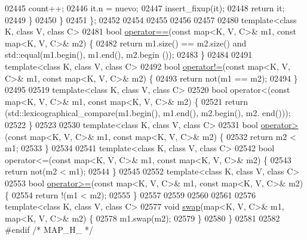 \begin{DoxyCode}
02445             count++;
02446             it.n = nuevo;
02447             insert\_fixup(it);
02448             \textcolor{keywordflow}{return} it;
02449         \}
02450     \}
02451 \};
02452 
02454 
02455 
02456 
02457 
02480 \textcolor{keyword}{template}<\textcolor{keyword}{class} K, \textcolor{keyword}{class} V, \textcolor{keyword}{class} C>
02481 \textcolor{keywordtype}{bool} \hyperlink{classaed2_1_1map_abfc51b39670220e79037ac067006e933_abfc51b39670220e79037ac067006e933}{operator==}(\textcolor{keyword}{const} map<K, V, C>& m1, \textcolor{keyword}{const} map<K, V, C>& m2) \{
02482     \textcolor{keywordflow}{return} m1.size() == m2.size() and std::equal(m1.begin(), m1.end(), m2.begin
      ());
02483 \}
02484 
02491 \textcolor{keyword}{template}<\textcolor{keyword}{class} K, \textcolor{keyword}{class} V, \textcolor{keyword}{class} C>
02492 \textcolor{keywordtype}{bool} \hyperlink{classaed2_1_1map_abce0fa35c5b25fd67111c2e704616f09_abce0fa35c5b25fd67111c2e704616f09}{operator!=}(\textcolor{keyword}{const} map<K, V, C>& m1, \textcolor{keyword}{const} map<K, V, C>& m2) \{
02493     \textcolor{keywordflow}{return} not(m1 == m2);
02494 \}
02495 
02519 \textcolor{keyword}{template}<\textcolor{keyword}{class} K, \textcolor{keyword}{class} V, \textcolor{keyword}{class} C>
02520 \textcolor{keywordtype}{bool} operator<(const map<K, V, C>& m1, \textcolor{keyword}{const} map<K, V, C>& m2) \{
02521     \textcolor{keywordflow}{return} (std::lexicographical\_compare(m1.begin(), m1.end(), m2.begin(), m2.
      end()));
02522 \}
02523 
02530 \textcolor{keyword}{template}<\textcolor{keyword}{class} K, \textcolor{keyword}{class} V, \textcolor{keyword}{class} C>
02531 \textcolor{keywordtype}{bool} \hyperlink{classaed2_1_1map_a2000cd874b72034ce7fe730c811b6c63_a2000cd874b72034ce7fe730c811b6c63}{operator>}(\textcolor{keyword}{const} map<K, V, C>& m1, \textcolor{keyword}{const} map<K, V, C>& m2) \{
02532     \textcolor{keywordflow}{return} m2 < m1;
02533 \}
02534 
02541 \textcolor{keyword}{template}<\textcolor{keyword}{class} K, \textcolor{keyword}{class} V, \textcolor{keyword}{class} C>
02542 \textcolor{keywordtype}{bool} operator<=(const map<K, V, C>& m1, \textcolor{keyword}{const} map<K, V, C>& m2) \{
02543     \textcolor{keywordflow}{return} not(m2 < m1);
02544 \}
02545 
02552 \textcolor{keyword}{template}<\textcolor{keyword}{class} K, \textcolor{keyword}{class} V, \textcolor{keyword}{class} C>
02553 \textcolor{keywordtype}{bool} \hyperlink{classaed2_1_1map_a093a6d1a055339c5fc6297a1d47a9159_a093a6d1a055339c5fc6297a1d47a9159}{operator>=}(\textcolor{keyword}{const} map<K, V, C>& m1, \textcolor{keyword}{const} map<K, V, C>& m2) \{
02554     \textcolor{keywordflow}{return} !(m1 < m2);
02555 \}
02557 
02559 
02560 
02561 
02576 \textcolor{keyword}{template}<\textcolor{keyword}{class} K, \textcolor{keyword}{class} V, \textcolor{keyword}{class} C>
02577 \textcolor{keywordtype}{void} \hyperlink{classaed2_1_1map_a119cb2938bbc11c25ebd4fb824782a72_a119cb2938bbc11c25ebd4fb824782a72}{swap}(map<K, V, C>& m1, map<K, V, C>& m2) \{
02578     m1.swap(m2);
02579 \}
02580 \}
02581 
02582 \textcolor{preprocessor}{#endif }\textcolor{comment}{/* MAP\_H\_ */}
\end{DoxyCode}
